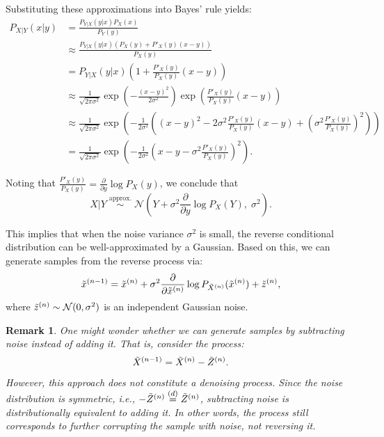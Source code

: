 \documentclass[11pt, a4paper]{article}
\newtheorem{remark}{Remark}
\begin{document}
Substituting these approximations into Bayes' rule yields:
\begin{align*}
    P_{X|Y}(x|y)
    & = \frac{P_{Y|X}(y|x) P_X(x)}{P_Y(y)} \\
    & \approx \frac{P_{Y|X}(y|x)\left(P_X(y) + P'_X(y)(x - y)\right)}{P_X(y)} \\
    & = P_{Y|X}(y|x)\left(1 + \frac{P'_X(y)}{P_X(y)} (x - y)\right) \\
    & \approx \frac{1}{\sqrt{2\pi\sigma^2}} \exp\left( -\frac{(x - y)^2}{2\sigma^2} \right) \exp\left( \frac{P'_X(y)}{P_X(y)} (x - y) \right) \\
    & \approx \frac{1}{\sqrt{2\pi\sigma^2}} \exp\left( -\frac{1}{2\sigma^2} \left((x - y)^2 - 2\sigma^2 \frac{P'_X(y)}{P_X(y)} (x - y) + \left(\sigma^2 \frac{P'_X(y)}{P_X(y)}\right)^2 \right) \right) \\
    & = \frac{1}{\sqrt{2\pi\sigma^2}} \exp\left( -\frac{1}{2\sigma^2} \left(x - y - \sigma^2 \frac{P'_X(y)}{P_X(y)}\right)^2 \right).
\end{align*}

Noting that \( \frac{P'_X(y)}{P_X(y)} = \frac{\partial}{\partial y} \log P_X(y) \), we conclude that
\[
X|Y \; \overset{\text{approx.}}{\sim} \; \mathcal{N}\left(Y + \sigma^2 \frac{\partial}{\partial y} \log P_X(Y), \; \sigma^2\right).
\]

This implies that when the noise variance \( \sigma^2 \) is small, the reverse conditional distribution can be well-approximated by a Gaussian.  
Based on this, we can generate samples from the reverse process via:
\[
\tilde{x}^{(n-1)} = \tilde{x}^{(n)} + \sigma^2 \frac{\partial}{\partial \tilde{x}^{(n)}} \log P_{\tilde{X}^{(n)}} (\tilde{x}^{(n)}) + \tilde{z}^{(n)},
\]
where \( \tilde{z}^{(n)} \sim \mathcal{N}(0, \sigma^2) \) is an independent Gaussian noise.


\begin{remark}
    One might wonder whether we can generate samples by subtracting noise instead of adding it. That is, consider the process:
    \begin{align}
        \tilde{X}^{(n-1)} = \tilde{X}^{(n)} - \tilde{Z}^{(n)}.
    \end{align}
    However, this approach does not constitute a denoising process. Since the noise distribution is symmetric, i.e., \( -\tilde{Z}^{(n)} \overset{(d)}{=} \tilde{Z}^{(n)} \), subtracting noise is distributionally equivalent to adding it. In other words, the process still corresponds to further corrupting the sample with noise, not reversing it.
\end{remark}
\end{document}
